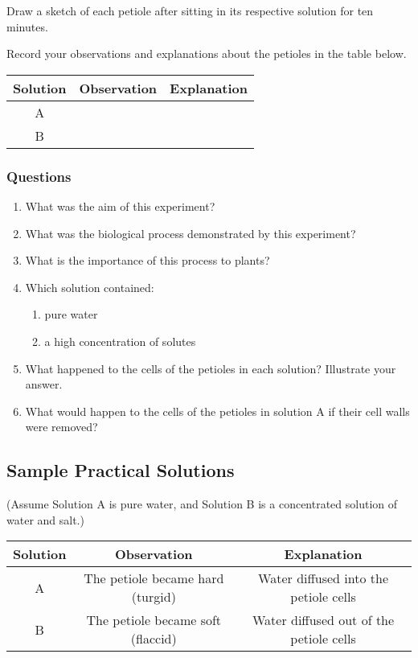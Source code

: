 Draw a sketch of each petiole after sitting in its respective solution for ten minutes.

Record your observations and explanations about the petioles in the table below.

\begin{center}
\begin{tabular}{ | c | c | c | }
\hline
Solution & Observation & Explanation \\ \hline
A & & \\ \hline
B & & \\ \hline
\hline
\end{tabular}
\end{center}

\subsubsection{Questions}
\begin{enumerate}
\item{What was the aim of this experiment?}
\item{What was the biological process demonstrated by this experiment?}
\item{What is the importance of this process to plants?}
\item{Which solution contained:}
\begin{enumerate}
\item{pure water}
\item{a high concentration of solutes}
\end{enumerate}
\item{What happened to the cells of the petioles in each solution? Illustrate your answer.}
\item{What would happen to the cells of the petioles in solution A if their cell walls were removed?}
\end{enumerate}

\subsection{Sample Practical Solutions}

(Assume Solution A is pure water, and Solution B is a concentrated solution of water and salt.)

\begin{center}
\begin{tabular}{ | c | c | c | }
\hline
Solution & Observation & Explanation \\ \hline
A & The petiole became hard (turgid) & Water diffused into the petiole cells \\ \hline
B & The petiole became soft (flaccid) & Water diffused out of the petiole cells \\ \hline
\hline
\end{tabular}
\end{center}

